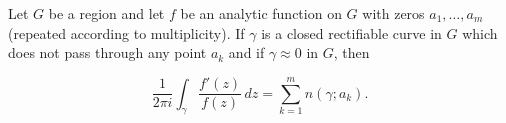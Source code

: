 Let $G$ be a region and let $f$ be an analytic function on $G$ with zeros $a_1, \ldots, a_m$ (repeated according to multiplicity). If $\gamma$ is a closed rectifiable curve in $G$ which does not pass through any point $a_k$ and if $\gamma \approx 0$ in $G$, then

$$\frac{1}{2\pi i} \int_{\gamma} \frac{f'(z)}{f(z)} \, dz = \sum_{k=1}^{m} n(\gamma; a_k).$$
